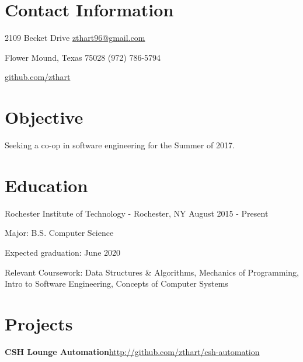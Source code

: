\documentclass[margin,line]{resume}
\newcommand{\rurl}[1]{\hfill {\footnotesize \url{#1}}}
\newcommand{\rdate}[1]{\hfill {\small #1}}
\begin{document}
\begin{resume}
\section{\mysidestyle Contact Information} 
	\begin{asparablank}
		\item 2109 Becket Drive  \hfill \href{mailto:zthart96@gmail.com}{zthart96@gmail.com}
		\item Flower Mound, Texas 75028 \hfill (972) 786-5794
		\item \hfill \rurl{github.com/zthart}
    \end{asparablank}

\section{\mysidestyle Objective}
	\begin{asparablank}
    	\item Seeking a co-op in software engineering for the Summer of 2017.
        \normalsize
        \\
	\end{asparablank}

\section{\mysidestyle Education}
	\begin{compactdesc}
		\item[Rochester Institute of Technology] - Rochester, NY \rdate{August 2015 - Present}
		\begin{compactitem} { \small
			\item Major: B.S. Computer Science
			\item Expected graduation: June 2020
            \item Relevant Coursework: Data Structures \& Algorithms, Mechanics of Programming, Intro to Software Engineering, Concepts of Computer Systems
		} \end{compactitem}
	\end{compactdesc}


\section{\mysidestyle Projects}
	\begin{asparablank}
		\item {\bf CSH Lounge Automation}\rurl{http://github.com/zthart/csh-automation}


\end{asparablank}
\end{resume}
\end{document}
